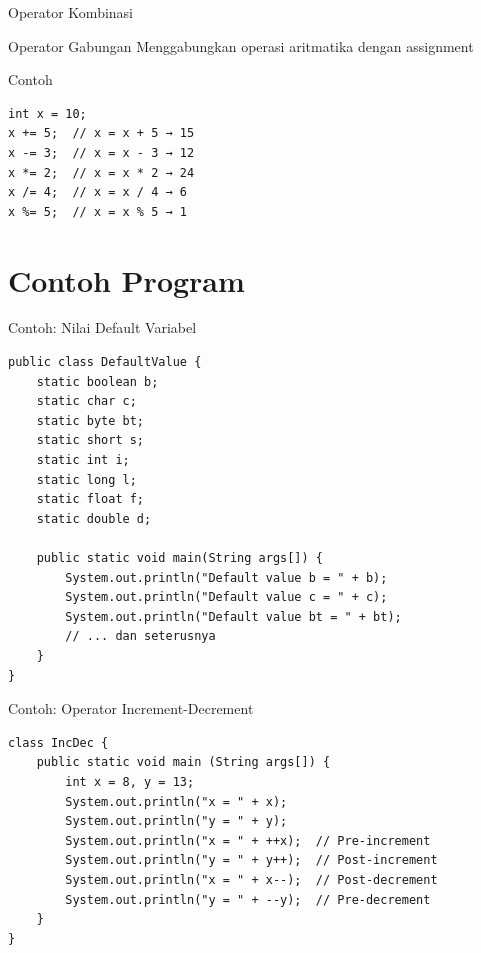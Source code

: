 \documentclass{beamer}
\begin{document}
\begin{frame}[fragile]{Operator Kombinasi}
  \begin{block}{Operator Gabungan}
    Menggabungkan operasi aritmatika dengan assignment
  \end{block}
  
  \begin{exampleblock}{Contoh}
\begin{lstlisting}
int x = 10;
x += 5;  // x = x + 5 → 15
x -= 3;  // x = x - 3 → 12
x *= 2;  // x = x * 2 → 24
x /= 4;  // x = x / 4 → 6
x %= 5;  // x = x % 5 → 1
\end{lstlisting}
  \end{exampleblock}
\end{frame}

\section{Contoh Program}
\begin{frame}[fragile]{Contoh: Nilai Default Variabel}
\begin{lstlisting}
public class DefaultValue {
    static boolean b;
    static char c;
    static byte bt;
    static short s;
    static int i;
    static long l;
    static float f;
    static double d;
    
    public static void main(String args[]) {
        System.out.println("Default value b = " + b);
        System.out.println("Default value c = " + c);
        System.out.println("Default value bt = " + bt);
        // ... dan seterusnya
    }
}
\end{lstlisting}
\end{frame}

\begin{frame}[fragile]{Contoh: Operator Increment-Decrement}
\begin{lstlisting}
class IncDec {
    public static void main (String args[]) {
        int x = 8, y = 13;
        System.out.println("x = " + x);
        System.out.println("y = " + y);
        System.out.println("x = " + ++x);  // Pre-increment
        System.out.println("y = " + y++);  // Post-increment
        System.out.println("x = " + x--);  // Post-decrement
        System.out.println("y = " + --y);  // Pre-decrement
    }
}
\end{lstlisting}
\end{frame}

\end{document}

